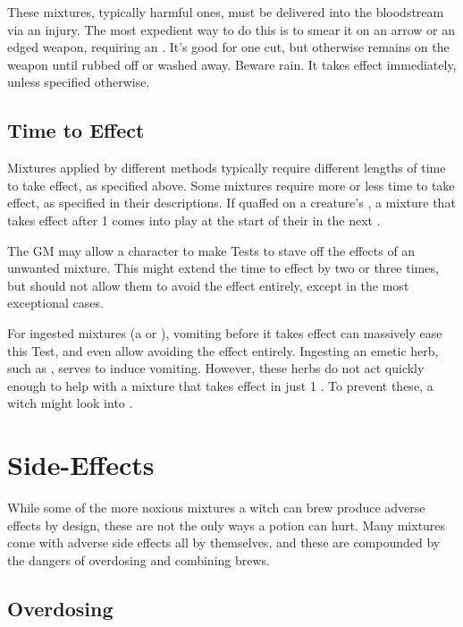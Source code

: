 These mixtures, typically harmful ones, must be delivered into the bloodstream via an injury.
The most expedient way to do this is to smear it on an arrow or an edged weapon, requiring an {\action}.
It's good for one cut, but otherwise remains on the weapon until rubbed off or washed away.
Beware rain.
It takes effect immediately, unless specified otherwise.


\subsection{Time to Effect}

Mixtures applied by different methods typically require different lengths of time to take effect, as specified above.
Some mixtures require more or less time to take effect, as specified in their descriptions.
If quaffed on a creature's {\turn}, a mixture that takes effect after 1 {\round} comes into play at the start of their {\turn} in the next {\round}.

The GM may allow a character to make  Tests to stave off the effects of an unwanted mixture.
This might extend the time to effect by two or three times, but should not allow them to avoid the effect entirely, except in the most exceptional cases.

For ingested mixtures (a  or ), vomiting before it takes effect can massively ease this  Test, and even allow avoiding the effect entirely.
Ingesting an emetic herb, such as , serves to induce vomiting.
However, these herbs do not act quickly enough to help with a mixture that takes effect in just 1 {\round}.
To prevent these, a witch might look into .

\section{Side-Effects}

While some of the more noxious mixtures a witch can brew produce adverse effects by design, these are not the only ways a potion can hurt.
Many mixtures come with adverse side effects all by themselves, and these are compounded by the dangers of overdosing and combining brews.

\subsection{Overdosing}

